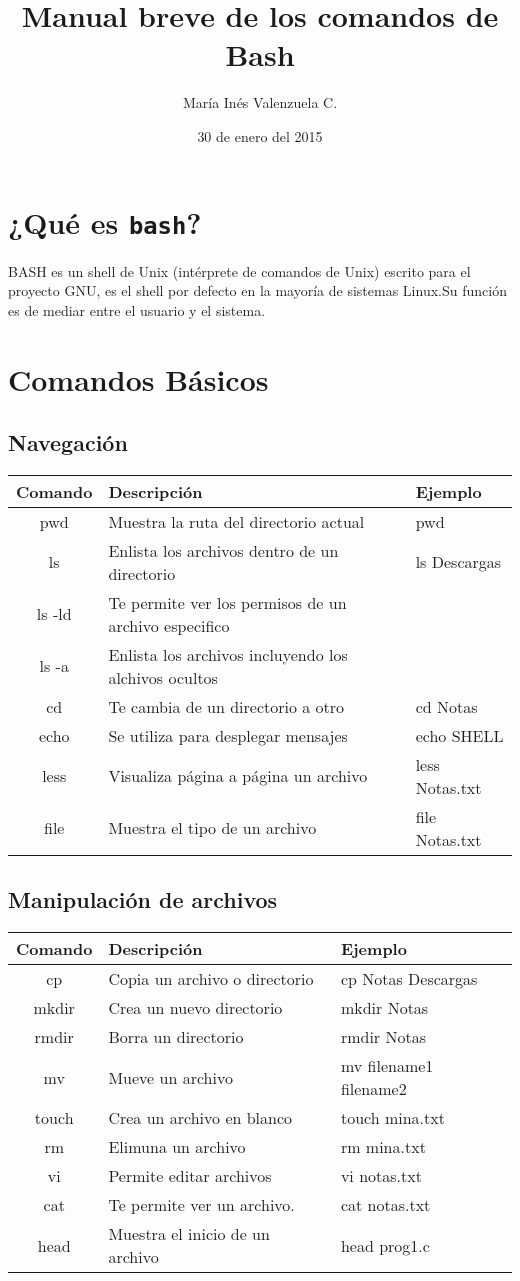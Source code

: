 \documentclass[12pt]{article}
\title{Manual breve de los comandos de Bash}
\author{ María Inés Valenzuela C.}
\date{30 de enero del 2015}
\begin{document}
\maketitle
\section{¿Qué es {\tt bash}?}
BASH es un shell de Unix (intérprete de comandos de Unix) escrito para el proyecto GNU, es el shell por defecto en la mayoría de sistemas Linux.Su función es de mediar entre el usuario y el sistema.
\section{Comandos Básicos}
\subsection{Navegación}
\begin{tabular}{|c|l|l|}
\hline
Comando & Descripción & Ejemplo \\
\hline
pwd  & Muestra la ruta del directorio actual &  pwd \\ \hline
ls & Enlista los archivos dentro de un directorio & ls Descargas \\ \hline
ls -ld & Te permite ver los permisos de un archivo especifico & \\ \hline
ls -a & Enlista los archivos incluyendo los alchivos ocultos & \\ \hline
cd & Te cambia de un directorio a otro & cd Notas \\
\hline
echo & Se utiliza para desplegar mensajes & echo SHELL \\ \hline
less & Visualiza página a página un archivo & less Notas.txt \\ \hline
file & Muestra el tipo de un archivo & file Notas.txt  \\ \hline
\end{tabular}
\subsection{Manipulación de archivos}
\begin{tabular}{|c|l|l|}
\hline
Comando & Descripción & Ejemplo \\
\hline
cp & Copia un archivo o directorio & cp Notas Descargas \\ \hline
mkdir &Crea un nuevo directorio & mkdir Notas \\ \hline
rmdir & Borra un directorio & rmdir Notas \\ \hline
mv & Mueve un archivo & mv filename1 filename2 \\ \hline
touch & Crea un archivo en blanco & touch mina.txt \\ \hline
rm & Elimuna un archivo & rm mina.txt \\ \hline
vi & Permite editar archivos & vi notas.txt \\ \hline
cat & Te permite ver un archivo. & cat notas.txt\\ \hline
head & Muestra el inicio de un archivo & head prog1.c \\ \hline
\end{tabular}
\end{document}
